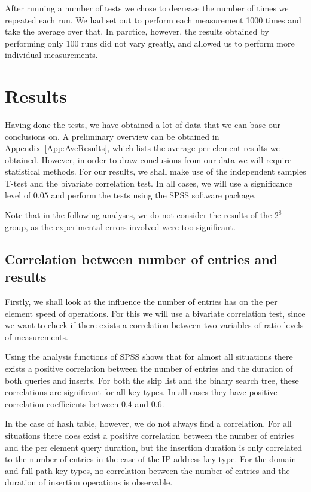 \documentclass[12pt,a4paper]{article}
\begin{document}
    After running a number of tests we chose to decrease the number of times we repeated each run.
    We had set out to perform each measurement 1000 times and take the average over that.  In
    parctice, however, the results obtained by performing only 100 runs did not vary greatly, and
    allowed us to perform more individual measurements.


    \section{Results}

    Having done the tests, we have obtained a lot of data that we can base our conclusions on.  A
    preliminary overview can be obtained in Appendix~\ref{App:AveResults}, which lists the average
    per-element results we obtained.  However, in order to draw conclusions from our data we will
    require statistical methods.  For our results, we shall make use of the independent samples
    T-test and the bivariate correlation test.  In all cases, we will use a significance level of
    $0.05$ and perform the tests using the SPSS software package.

    Note that in the following analyses, we do not consider the results of the $2^8$ group, as the
    experimental errors involved were too significant.

    \subsection{Correlation between number of entries and results}

    Firstly, we shall look at the influence the number of entries has on the per element speed of
    operations.  For this we will use a bivariate correlation test, since we want to check if there
    exists a correlation between two variables of ratio levels of measurements.

    Using the analysis functions of SPSS shows that for almost all situations there exists a
    positive correlation between the number of entries and the duration of both queries and inserts.
    For both the skip list and the binary search tree, these correlations are significant for all
    key types. In all cases they have positive correlation coefficients between $0.4$ and $0.6$.

    In the case of hash table, however, we do not always find a correlation.  For all situations there does
    exist a positive correlation between the number of entries and the per element query duration, but
    the insertion duration is only correlated to the number of entries in the case of the IP address
    key type.  For the domain and full path key types, no correlation between the number of entries
    and the duration of insertion operations is observable.
\end{document}
